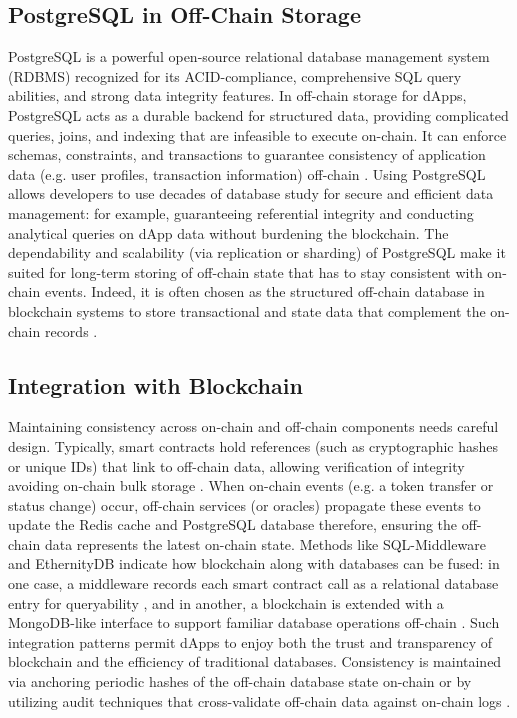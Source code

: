 \documentclass[a4paper,10pt]{report}
\begin{document}
\subsection{PostgreSQL in Off-Chain Storage}
PostgreSQL is a powerful open-source relational database management system (RDBMS) recognized for its ACID-compliance, comprehensive SQL query abilities, and strong data integrity features.  In off-chain storage for dApps, PostgreSQL acts as a durable backend for structured data, providing complicated queries, joins, and indexing that are infeasible to execute on-chain.  It can enforce schemas, constraints, and transactions to guarantee consistency of application data (e.g. user profiles, transaction information) off-chain \cite{helmer2018ethernitydb, thegraph2023}.  Using PostgreSQL allows developers to use decades of database study for secure and efficient data management: for example, guaranteeing referential integrity and conducting analytical queries on dApp data without burdening the blockchain.  The dependability and scalability (via replication or sharding) of PostgreSQL make it suited for long-term storing of off-chain state that has to stay consistent with on-chain events.  Indeed, it is often chosen as the structured off-chain database in blockchain systems to store transactional and state data that complement the on-chain records \cite{marinho2020ehealth}.

\subsection{Integration with Blockchain}
Maintaining consistency across on-chain and off-chain components needs careful design.  Typically, smart contracts hold references (such as cryptographic hashes or unique IDs) that link to off-chain data, allowing verification of integrity avoiding on-chain bulk storage \cite{lopez2019health, helmer2018ethernitydb}.  When on-chain events (e.g. a token transfer or status change) occur, off-chain services (or oracles) propagate these events to update the Redis cache and PostgreSQL database therefore, ensuring the off-chain data represents the latest on-chain state.  Methods like SQL-Middleware and EthernityDB indicate how blockchain along with databases can be fused: in one case, a middleware records each smart contract call as a relational database entry for queryability \cite{tong2021sqlmiddleware}, and in another, a blockchain is extended with a MongoDB-like interface to support familiar database operations off-chain \cite{helmer2018ethernitydb}.  Such integration patterns permit dApps to enjoy both the trust and transparency of blockchain and the efficiency of traditional databases.  Consistency is maintained via anchoring periodic hashes of the off-chain database state on-chain or by utilizing audit techniques that cross-validate off-chain data against on-chain logs \cite{helmer2018ethernitydb}.
\end{document}
